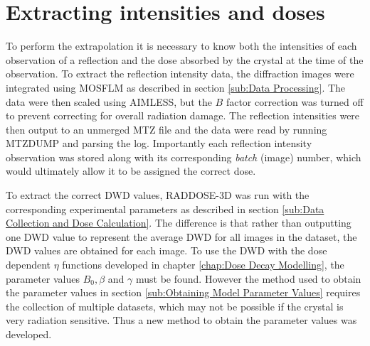 \section{Extracting intensities and doses}
\label{sec:Extracting Intensities and Doses}
To perform the extrapolation it is necessary to know both the intensities of each observation of a reflection and the dose absorbed by the crystal at the time of the observation.
To extract the reflection intensity data, the diffraction images were integrated using MOSFLM as described in section \ref{sub:Data Processing}.
The data were then scaled using AIMLESS, but the $B$ factor correction was turned off to prevent correcting for overall radiation damage.
The reflection intensities were then output to an unmerged MTZ file and the data were read by running MTZDUMP and parsing the log.
Importantly each reflection intensity observation was stored along with its corresponding \textit{batch} (image) number, which would ultimately allow it to be assigned the correct dose.

To extract the correct DWD values, RADDOSE-3D was run with the corresponding experimental parameters as described in section \ref{sub:Data Collection and Dose Calculation}.
The difference is that rather than outputting one DWD value to represent the average DWD for all images in the dataset, the DWD values are obtained for each image.
To use the DWD with the dose dependent $\eta$ functions developed in chapter \ref{chap:Dose Decay Modelling}, the parameter values $B_0, \beta$ and $\gamma$ must be found.
However the method used to obtain the parameter values in section \ref{sub:Obtaining Model Parameter Values} requires the collection of multiple datasets, which may not be possible if the crystal is very radiation sensitive.
Thus a new method to obtain the parameter values was developed.

